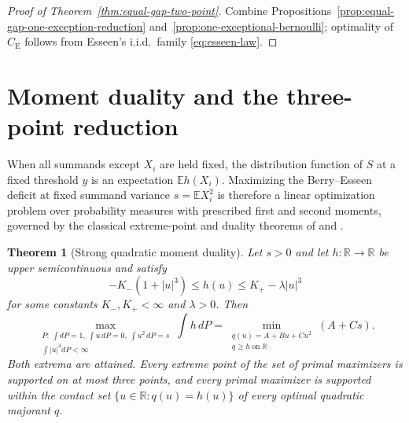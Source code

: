 \documentclass[11pt]{article}
\numberwithin{equation}{section}
\newtheorem{theorem}{Theorem}[section]
\theoremstyle{definition}
\theoremstyle{remark}
\newcommand{\E}{\mathbb E}
\newcommand{\R}{\mathbb R}
\newcommand{\be}{C_{\mathrm E}}
\begin{document}
\begin{proof}[Proof of Theorem~\ref{thm:equal-gap-two-point}]
Combine Propositions~\ref{prop:equal-gap-one-exception-reduction}
and~\ref{prop:one-exceptional-bernoulli}; optimality of $\be$ follows from
Esseen's i.i.d.\ family \eqref{eq:esseen-law}.
\end{proof}

\section{Moment duality and the three-point reduction}\label{sec:moments}

When all summands except $X_i$ are held fixed, the distribution function of
$S$ at a fixed threshold $y$ is an expectation $\E h(X_i)$. Maximizing the
Berry--Esseen deficit at fixed summand variance $s=\E X_i^2$ is therefore a
linear optimization problem over probability measures with prescribed first
and second moments, governed by the classical extreme-point and duality
theorems of \citet[Theorem~2.1]{Winkler1988} and
\citet[Theorem~2.2]{BertsimasPopescu2005}.

\begin{samepage}
\begin{theorem}[Strong quadratic moment duality]\label{thm:strongdual}
Let $s>0$ and let $h:\R\to\R$ be upper semicontinuous and satisfy
\[
 -K_-(1+|u|^3)\leq h(u)\leq K_+-\lambda|u|^3
\]
for some constants $K_-,K_+<\infty$ and $\lambda>0$. Then
\begin{equation}
 \max_{\substack{P:\ \int dP=1,\ \int u\,dP=0,\ \int u^2\,dP=s\\
                         \int|u|^3dP<\infty}}
       \int h\,dP
 =\min_{\substack{q(u)=A+Bu+Cu^2\\q\geq h\ \text{on }\R}}(A+Cs).
 \label{eq:coordinate-duality}
\end{equation}
Both extrema are attained. Every extreme point of the set of primal maximizers
is supported on at most three points, and every primal maximizer is supported
within the contact set $\{u\in\R:q(u)=h(u)\}$ of every optimal quadratic
majorant $q$.
\end{theorem}
\end{samepage}
\end{document}
